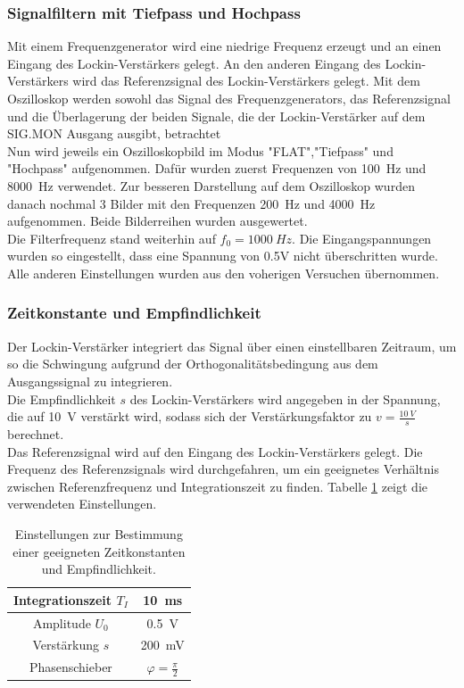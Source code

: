 \documentclass[12pt,a4paper]{article}
\begin{document}
\subsubsection{Signalfiltern mit Tiefpass und Hochpass}
Mit einem Frequenzgenerator wird eine niedrige Frequenz erzeugt und an einen Eingang des Lockin-Verstärkers gelegt. An den anderen Eingang des Lockin-Verstärkers wird das Referenzsignal des Lockin-Verstärkers gelegt. Mit dem Oszilloskop werden sowohl das Signal des Frequenzgenerators, das Referenzsignal und die Überlagerung der beiden Signale, die der Lockin-Verstärker auf dem SIG.MON Ausgang ausgibt, betrachtet\\
Nun wird jeweils ein Oszilloskopbild im Modus "FLAT","Tiefpass" und "Hochpass" aufgenommen. Dafür wurden zuerst Frequenzen von \SI{100}{Hz} und \SI{8000}{Hz} verwendet. Zur besseren Darstellung auf dem Oszilloskop wurden danach nochmal 3 Bilder mit den Frequenzen \SI{200}{Hz} und \SI{4000}{Hz} aufgenommen. Beide Bilderreihen wurden ausgewertet.\\
Die Filterfrequenz stand weiterhin auf $f_0 = \SI{1000}{Hz}$. Die Eingangspannungen wurden so eingestellt, dass eine Spannung von 0.5V nicht überschritten wurde. Alle anderen Einstellungen wurden aus den voherigen Versuchen übernommen.

\subsubsection{Zeitkonstante und Empfindlichkeit}

Der Lockin-Verstärker integriert das Signal über einen einstellbaren Zeitraum, um so die Schwingung aufgrund der Orthogonalitätsbedingung aus dem Ausgangssignal zu integrieren. \\
Die Empfindlichkeit $s$ des Lockin-Verstärkers wird angegeben in der Spannung, die auf \SI{10}{V} verstärkt wird, sodass sich der Verstärkungsfaktor zu $v = \frac{\SI{10}{V}}{s}$ berechnet. \\
Das Referenzsignal wird auf den Eingang des Lockin-Verstärkers gelegt. Die Frequenz des Referenzsignals wird durchgefahren, um ein geeignetes Verhältnis zwischen Referenzfrequenz und Integrationszeit zu finden. Tabelle \ref{tab:Zeitkonst_Einstellungen} zeigt die verwendeten Einstellungen.

\begin{table}[H]
\centering
\begin{tabular}{|c|c|}
\hline 
Integrationszeit $T_I$ & \SI{10}{ms} \\ 
\hline 
Amplitude $U_0$ & \SI{0,5}{V} \\
\hline 
Verstärkung $s$ & \SI{200}{mV} \\ 
\hline 
Phasenschieber & $\varphi = \frac{\pi}{2}$ \\ 
\hline 
\end{tabular} 
\caption{Einstellungen zur Bestimmung einer geeigneten Zeitkonstanten und Empfindlichkeit.}
\label{tab:Zeitkonst_Einstellungen}
\end{table}
\end{document}
